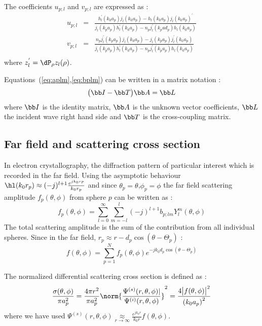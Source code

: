 The coefficients $u_{p;l}$ and $v_{p;l}$ are expressed as :
\begin{eqnarray*}
  u_{p;l} &=& \frac{h_l^{'}(k_0a_p)j_l(k_0a_p) - h_l(k_0a_p)j_l(k_0a_p)^{'}}
    {j_l(k_pa_p)h_l^{'}(k_0a_p)-n_pj_l^{'}(k_pad_p)h_l(k_0a_p)} \\
  v_{p;l} &=& \frac{n_pj_l^{'}(k_pa_p)j_l(k_0a_p) - j_l(k_pa_p)j_l^{'}(k_0a_p)}
    {j_l(k_pa_p)h_l^{'}(k_0a_p)-n_pj_l^{'}(k_pa_p)h_l(k_0a_p)} \\
\end{eqnarray*}
%
where $z_l^{'}=\dP_{\rho}z_l(\rho)$.

Equations~(\ref{eq:aplm},\ref{eq:bplm}) can be written in a matrix notation :
%
\begin{equation}\label{eq:Tsystem}
  \big(\bb I - \bb T \big)\bb A = \bb L
\end{equation}
%
where
$\bb I$ is the identity matrix,
$\bb A$ is the unknown vector coefficients,
$\bb L$ the incident wave right hand side and
$\bb T$ is the cross-coupling matrix.


\subsection{Far field and scattering cross section}
In electron crystallography, the diffraction pattern of particular
interest which is recorded in the far field. Using the asymptotic
behaviour $\hl(k_0r_p)\approx (-j)^{l+1}\frac{e^{jk_0rp}}{k_0r_p}$
and since $\theta_p=\theta$,$\phi_p=\phi$
the far field scattering amplitude $f_p(\theta,\phi)$ from sphere $p$ can
be written as :
%
\begin{equation}\label{eq:fp_theta}
  f_p(\theta,\phi) = \sum_{l=0}^{\infty}\sum_{m=-l}^{l} (-j)^{l+1}b_{p;lm}Y_l^m(\theta,\phi)
\end{equation}
%
The total scattering amplitude is the sum of the contribution from all
individual spheres.
Since in the far field, $r_p\approx r-d_p\cos(\theta-\Theta_p)$ :
%
\begin{equation}\label{eq:f_theta}
  f(\theta,\phi) = \sum_{p=1}^{N} f_p(\theta,\phi)e^{-jk_0d_p\cos(\theta-\Theta_p)}
\end{equation}
%

The normalized differential scattering cross section is defined as :
%
\begin{equation}\label{eq:sigma}
  \frac{\sigma(\theta,\phi)}{\pi a_p^2}
  = \frac{4\pi r^2}{\pi a_p^2}
    \norm{\frac{\Psi^{(s)}(r,\theta,\phi)|}{\Psi^{(i)}(r,\theta,\phi)}}^2
  = \frac{4\bigl|f(\theta,\phi)\bigr|^2}{\left(k_0a_p\right)^2}
\end{equation}
%
where we have used
$\Psi^{(s)}(r,\theta,\phi) \underset{r\rightarrow\infty}\approx \frac{e^{jk_0r}}{k_0r}f(\theta,\phi)$.





